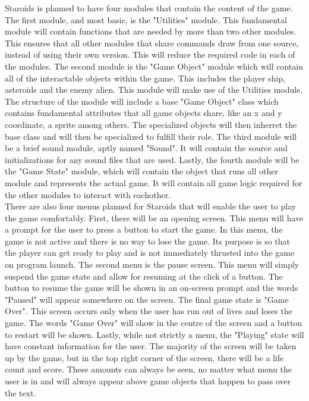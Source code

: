 \documentclass{article}
\begin{document}
Staroids is planned to have four modules that contain the content of the game. The first module, and most basic, is the "Utilities" module. This fundamental module will contain functions that are needed by more than two other modules. This ensures that all other modules that share commands draw from one source, instead of using their own version. This will reduce the required code in each of the modules. The second module is the "Game Object" module which will contain all of the interactable objects within the game. This includes the player ship, asteroids and the enemy alien. This module will make use of the Utilities module. The structure of the module will include a base "Game Object" class which contains fundamental attributes that all game objects share, like an x and y coordinate, a sprite among others. The specialized objects will then inherret the base class and will then be specialized to fulfill their role. The third module will be a brief sound module, aptly named "Sound". It will contain the source and initializations for any sound files that are used. Lastly, the fourth module will be the "Game State" module, which will contain the object that runs all other module and represents the actual game. It will contain all game logic required for the other modules to interact with eachother.\\
There are also four menus planned for Staroids that will enable the user to play the game comfortably. First, there will be an opening screen. This menu will have a prompt for the user to press a button to start the game. In this menu, the game is not active and there is no way to lose the game. Its purpose is so that the player can get ready to play and is not immediately thrusted into the game on program launch. The second menu is the pause screen. This menu will simply suspend the game state and allow for resuming at the click of a button. The button to resume the game will be shown in an on-screen prompt and the words "Paused" will appear somewhere on the screen. The final game state is "Game Over". This screen occurs only when the user has run out of lives and loses the game. The words "Game Over" will show in the centre of the screen and a button to restart will be shown. Lastly, while not strictly a menu, the "Playing" state will have constant information for the user. The majority of the screen will be taken up by the game, but in the top right corner of the screen, there will be a life count and score. These amounts can always be seen, no matter what menu the user is in and will always appear above game objects that happen to pass over the text.\\
\end{document}
